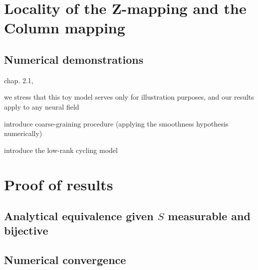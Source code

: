 \documentclass[NETN,manuscript]{stjour-new}
\begin{document}
\section{Locality of the Z-mapping and the Column mapping}









\subsection{Numerical demonstrations}

chap. 2.1, 

we stress that this toy model serves only for illustration purposes, and our results apply to any neural field

introduce coarse-graining procedure (applying the smoothness hypothesis numerically)

introduce the low-rank cycling model

\section{Proof of results}

\subsection{Analytical equivalence given $S$ measurable and bijective}
\label{sec:proof-equivalence}

\subsection{Numerical convergence}
\end{document}
